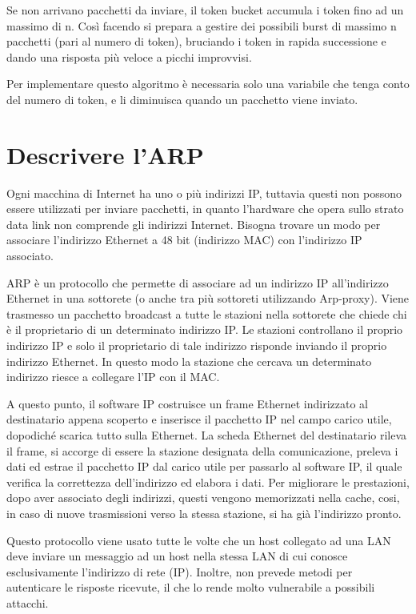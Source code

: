 Se non arrivano pacchetti da inviare, il token bucket accumula i token fino ad un massimo di n. Così facendo si prepara a gestire dei possibili burst di massimo n pacchetti (pari al numero di token), bruciando i token in rapida successione e dando una risposta più veloce a picchi improvvisi.

Per implementare questo algoritmo è necessaria solo una variabile che tenga conto del numero di token, e li diminuisca quando un pacchetto viene inviato.
 
\section{Descrivere l’ARP}
Ogni macchina di Internet ha uno o più indirizzi IP, tuttavia questi non possono essere utilizzati per inviare pacchetti, in quanto l’hardware che opera sullo strato data link non comprende gli indirizzi Internet.
Bisogna trovare un modo per associare l’indirizzo Ethernet a 48 bit (indirizzo MAC) con l’indirizzo IP associato.

ARP è un protocollo che permette di associare ad un indirizzo IP all’indirizzo Ethernet in una sottorete (o anche tra più sottoreti utilizzando Arp-proxy).
Viene trasmesso un pacchetto broadcast a tutte le stazioni nella sottorete che chiede chi è il proprietario di un determinato indirizzo IP. Le stazioni controllano il proprio indirizzo IP e solo il proprietario di tale indirizzo risponde inviando il proprio indirizzo Ethernet. In questo modo la stazione che cercava un determinato indirizzo riesce a collegare l’IP con il MAC.

A questo punto, il software IP costruisce un frame Ethernet indirizzato al destinatario appena scoperto e inserisce il pacchetto IP nel campo carico utile, dopodiché scarica tutto sulla Ethernet. 
La scheda Ethernet del destinatario rileva il frame, si accorge di essere la stazione designata della comunicazione, preleva i dati ed estrae il pacchetto IP dal carico utile per passarlo al software IP, il quale verifica la correttezza dell’indirizzo ed elabora i dati.
Per migliorare le prestazioni, dopo aver associato degli indirizzi, questi vengono memorizzati nella cache, cosi, in caso di nuove trasmissioni verso la stessa stazione, si ha già l’indirizzo pronto.

Questo protocollo viene usato tutte le volte che un host collegato ad una LAN deve inviare un messaggio ad un host nella stessa LAN di cui conosce esclusivamente l’indirizzo di rete (IP). Inoltre, non prevede metodi per autenticare le risposte ricevute, il che lo rende molto vulnerabile a possibili attacchi.

